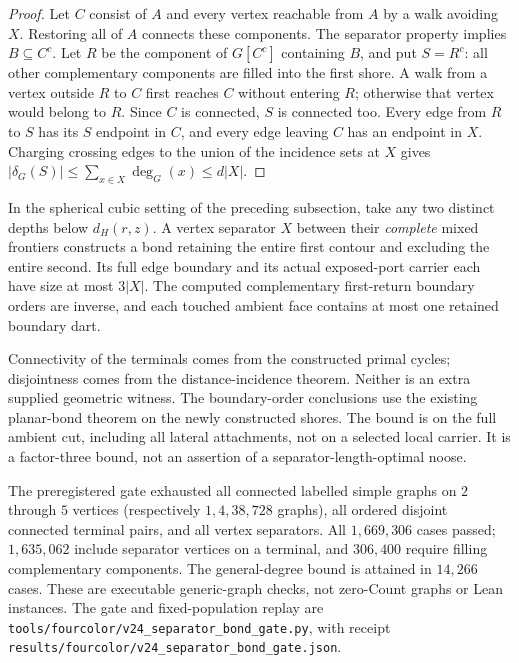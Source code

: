 \begin{proof}
Let $C$ consist of $A$ and every vertex reachable from $A$ by a walk
avoiding $X$.  Restoring all of $A$ connects these components.  The
separator property implies $B\subseteq C^c$.  Let $R$ be the component of
$G[C^c]$ containing $B$, and put $S=R^c$: all other complementary
components are filled into the first shore.  A walk from a vertex outside
$R$ to $C$ first reaches $C$ without entering $R$; otherwise that vertex
would belong to $R$.  Since $C$ is connected, $S$ is connected too.
Every edge from $R$ to $S$ has its $S$ endpoint in $C$, and every edge
leaving $C$ has an endpoint in $X$.  Charging crossing edges to the union
of the incidence sets at $X$ gives
$|\delta_G(S)|\le\sum_{x\in X}\deg_G(x)\le d|X|$.
\end{proof}

\begin{theorem}
In the spherical cubic setting of the preceding subsection, take any two
distinct depths below $d_H(r,z)$.  A vertex separator $X$ between their
\emph{complete} mixed frontiers constructs a bond retaining the entire
first contour and excluding the entire second.  Its full edge boundary
and its actual exposed-port carrier each have size at most $3|X|$.
The computed complementary first-return boundary orders are inverse, and
each touched ambient face contains at most one retained boundary dart.
\end{theorem}

Connectivity of the terminals comes from the constructed primal cycles;
disjointness comes from the distance-incidence theorem.  Neither is an
extra supplied geometric witness.  The boundary-order conclusions use the
existing planar-bond theorem on the newly constructed shores.  The bound
is on the full ambient cut, including all lateral attachments, not on a
selected local carrier.  It is a factor-three bound, not an assertion of
a separator-length-optimal noose.

The preregistered gate exhausted all connected labelled simple graphs on
$2$ through $5$ vertices (respectively $1,4,38,728$ graphs), all ordered
disjoint connected terminal pairs, and all vertex separators.  All
$1{,}669{,}306$ cases passed; $1{,}635{,}062$ include separator vertices
on a terminal, and $306{,}400$ require filling complementary components.
The general-degree bound is attained in $14{,}266$ cases.  These are
executable generic-graph checks, not zero-Count graphs or Lean instances.
The gate and fixed-population replay are
\texttt{tools/fourcolor/v24\_separator\_bond\_gate.py}, with receipt
\texttt{results/fourcolor/v24\_separator\_bond\_gate.json}.

